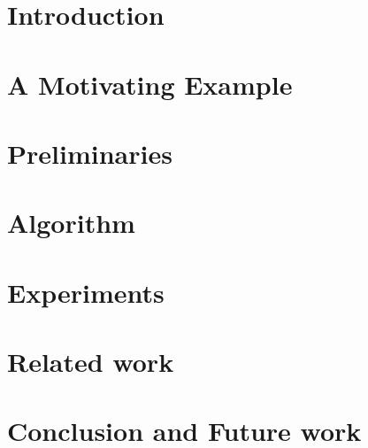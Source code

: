 \documentclass{llncs}
\begin{document}
\section{Introduction}
\label{sec:intro}



\section{A Motivating Example}
\label{sec:motivation}

\clearpage
\section{Preliminaries}
\label{sec:model}




\section{Algorithm}
\label{sec:algo}


\clearpage


% 

\section{Experiments}
\label{sec:experiments}


\section{Related work}
\label{sec:related}



\section{Conclusion and Future work}
\label{sec:conclusion}





\appendix


\end{document}
